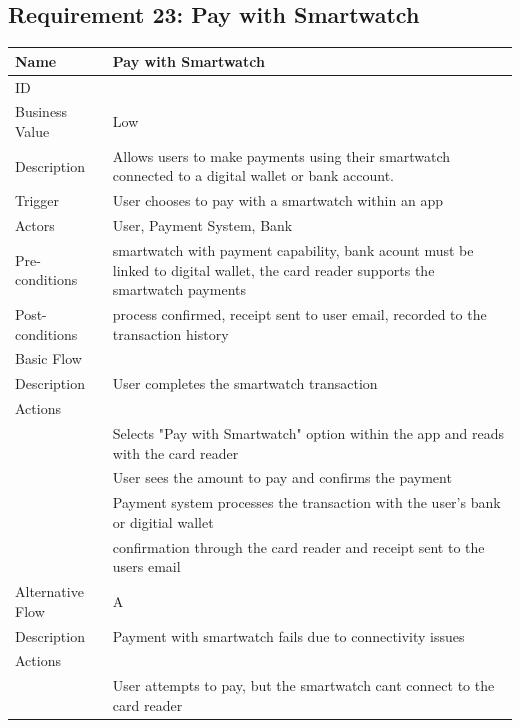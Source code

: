 \documentclass{article}
\begin{document}
\subsection{Requirement 23: Pay with Smartwatch}
	\begin{center}
		\begin{tabularx}{1.0\textwidth}{|>{\raggedright\arraybackslash}p{}|>{\raggedright\arraybackslash}X|}
			\hline
			Name             & Pay with Smartwatch \\ \hline
			ID               & 23 \\ \hline
			Business Value   & Low \\ \hline
			Description      & Allows users to make payments using their smartwatch connected to a digital wallet or bank account. \\ \hline
			Trigger          & User chooses to pay with a smartwatch within an app  \\ \hline
			Actors           & User, Payment System, Bank \\ \hline
			Pre-conditions   & smartwatch with payment capability, bank acount must be linked to digital wallet, the card reader supports the smartwatch payments \\ \hline
			Post-conditions  & process confirmed, receipt sent to user email, recorded to the transaction history \\ \hline
			Basic Flow       & \\ \hline
							Description & User completes the smartwatch transaction \\ \hline
							Actions & \\ \hline
							1 & Selects "Pay with Smartwatch" option within the app and reads with the card reader \\ \hline
							2 & User sees the amount to pay and confirms the payment  \\ \hline
							3 & Payment system processes the transaction with the user's bank or digitial wallet \\ \hline
							4 & confirmation through the card reader and receipt sent to the users email \\ \hline
			Alternative Flow & A \\ \hline
							Description & Payment with smartwatch fails due to connectivity issues \\ \hline
							Actions & \\ \hline
							1 & User attempts to pay, but the smartwatch cant connect to the card reader \\ \hline

\end{tabularx}
\end{center}
\end{document}
